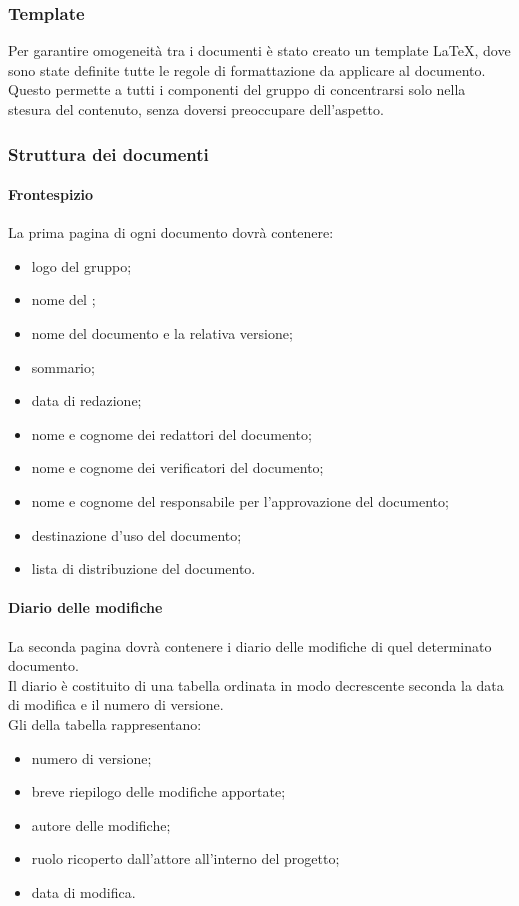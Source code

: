 \subsubsection{Template}
Per garantire omogeneità tra i documenti è stato creato un template \LaTeX, dove sono state definite tutte le regole di formattazione da applicare al documento. Questo permette a tutti i componenti del gruppo di concentrarsi solo nella stesura del contenuto, senza doversi preoccupare dell'aspetto. 
\subsubsection{Struttura dei documenti}
 \paragraph{Frontespizio} 
La prima pagina di ogni documento dovrà contenere:
\begin{itemize}
	\item logo del gruppo;
	\item nome del ;
	\item nome del documento e la relativa versione;
	\item sommario;
	\item data di redazione;
	\item nome e cognome dei redattori del documento;
	\item nome e cognome dei verificatori del documento;
	\item nome e cognome del responsabile per l'approvazione del documento;
	\item destinazione d'uso del documento;
	\item lista di distribuzione del documento.
\end{itemize}
 \paragraph{Diario delle modifiche}
 La seconda pagina dovrà contenere i diario delle modifiche di quel determinato documento.\\
 Il diario è costituito di una tabella ordinata in modo decrescente seconda la data di modifica e il numero di versione.\\
 Gli  della tabella rappresentano:
 \begin{itemize}
 	\item numero di versione;
 	\item breve riepilogo delle modifiche apportate;
 	\item autore delle modifiche;
 	\item ruolo ricoperto dall'attore all'interno del progetto;
 	\item data di modifica.
 \end{itemize}
